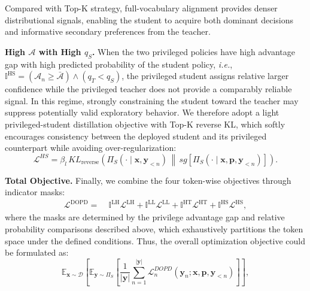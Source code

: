 \documentclass{llmxive}
\begin{document}
Compared with Top-K strategy, full-vocabulary alignment provides denser distributional signals, enabling the student to acquire both dominant decisions and informative secondary preferences from the teacher.



\noindent\textbf{High $\mathcal{A}$ with High $q_{S}$.}
When the two privileged policies have high advantage gap with high predicted probability of the student policy, \textit{i.e.}, $\mathbb{I}^{\mathrm{HS}}=\left(\mathcal{A}_{n} \geq \bar{\mathcal{A}} \right)\wedge \left(q_{T} < q_{S}\right)$, the privileged student assigns relative larger confidence while the privileged teacher does not provide a comparably reliable signal. 
In this regime, strongly constraining the student toward the teacher may suppress potentially valid exploratory behavior. 
We therefore adopt a light privileged-student distillation objective with Top-K reverse KL, which softly encourages consistency between the deployed student and its privileged counterpart while avoiding over-regularization:
\begin{equation}
    \mathcal{L}^{HS}
    =
    \beta_{l}\,
    KL_{\mathrm{reverse}}
    \left(
        \Pi_{S}\left(\cdot\mid \mathbf{x},\mathbf{y}_{<n}\right)
        \,\middle\|\,
        sg\left[
        \Pi_{S}\left(\cdot\mid \mathbf{x},\mathbf{p},\mathbf{y}_{<n}\right)
        \right]
    \right).
\end{equation}


\noindent\textbf{Total Objective.}
Finally, we combine the four token-wise objectives through indicator masks:
\begin{equation}
\begin{aligned}
    \mathcal{L}^{\mathrm{DOPD}}
    =&\;
    \mathbb{I}^{\mathrm{LH}}\mathcal{L}^{\mathrm{LH}}
    +
    \mathbb{I}^{\mathrm{LL}}\mathcal{L}^{\mathrm{LL}}
    +
    \mathbb{I}^{\mathrm{HT}}\mathcal{L}^{\mathrm{HT}}
    +
    \mathbb{I}^{\mathrm{HS}}\mathcal{L}^{\mathrm{HS}},
\end{aligned}
\end{equation}
where the masks are determined by the privilege advantage gap and relative probability comparisons described above, which exhaustively partitions the token space under the defined conditions. Thus, the overall optimization objective could be formulated as:
\begin{equation}
    \mathbb{E}_{\mathbf{x} \sim \mathcal{D}}\left[\mathbb{E}_{\mathbf{y} \sim \Pi_{S}}\left[\frac{1}{|\mathbf{y}|} \sum_{n=1}^{|\mathbf{y}|} \mathcal{L}_{n}^{DOPD}\left(\mathbf{y}_{n} ; \mathbf{x}, \mathbf{p}, \mathbf{y}_{<n}\right)\right]\right],
\end{equation}
\end{document}
